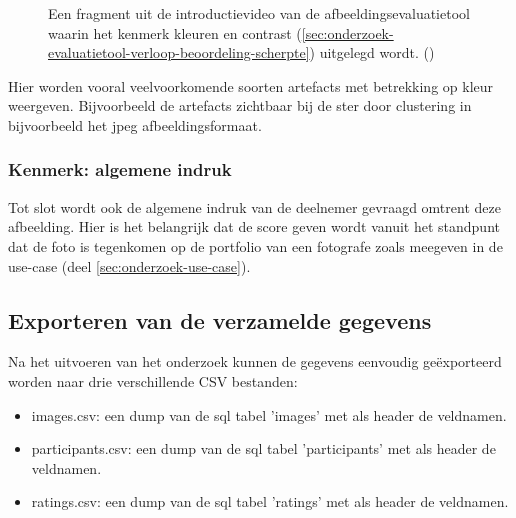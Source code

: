\begin{figure}[]
	\centering
	\caption{Een fragment uit de introductievideo van de \gls{afbeeldingsevaluatietool} waarin het kenmerk kleuren en contrast (\ref{sec:onderzoek-evaluatietool-verloop-beoordeling-scherpte}) uitgelegd wordt. (\cite{introductievideo})}
	\label{fig:kenmerk-kleuren}
\end{figure}

Hier worden vooral veelvoorkomende soorten \glspl{artefact} met betrekking op kleur weergeven. Bijvoorbeeld de \glspl{artefact} zichtbaar bij de ster door clustering in bijvoorbeeld het \gls{jpeg} \gls{afbeeldingsformaat}.


\subsubsection{Kenmerk: algemene indruk}
\label{sec:onderzoek-evaluatietool-verloop-beoordeling-algemeen}

Tot slot wordt ook de algemene indruk van de deelnemer gevraagd omtrent deze afbeelding. Hier is het belangrijk dat de score geven wordt vanuit het standpunt dat de foto is tegenkomen op de portfolio van een fotografe zoals meegeven in de \gls{use-case} (deel \ref{sec:onderzoek-use-case}).

\subsection{Exporteren van de verzamelde gegevens}
\label{sec:onderzoek-evaluatietool-export}

Na het uitvoeren van het onderzoek kunnen de gegevens eenvoudig geëxporteerd worden naar drie verschillende CSV bestanden:

\begin{itemize}
	
	\item images.csv: een dump van de \gls{sql} tabel 'images' met als header de veldnamen.
	
	\item participants.csv: een dump van de \gls{sql} tabel 'participants' met als header de veldnamen.
	
	\item ratings.csv: een dump van de \gls{sql} tabel 'ratings' met als header de veldnamen.
\end{itemize}

